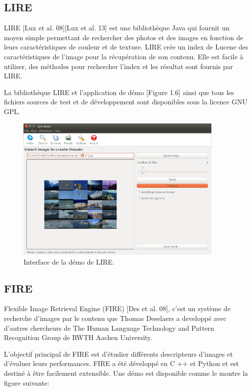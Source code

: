 \subsection*{LIRE}
	LIRE [Lux et al. 08][Lux et al. 13] est une bibliothèque Java qui fournit un moyen simple permettant de rechercher des photos et des images en fonction de leurs caractéristiques de couleur et de texture. LIRE crée un index de Lucene des caractéristiques de l'image pour la récupération de son contenu. Elle est facile à utiliser, des méthodes pour rechercher l'index et les résultat sont fournis par LIRE.
	
	La bibliothèque LIRE et l'application de démo [Figure 1.6] ainsi que tous les fichiers sources de test et de développement sont disponibles sous la licence GNU GPL.

\begin{figure}[H]
	\centering
		\includegraphics[width=4in]{Figures/lire-demo.png}
	\caption[An Electron]{Interface de la démo de LIRE.}
	\label{fig:Electron}
\end{figure}


\subsection*{FIRE}
	Flexible Image Retrieval Engine (FIRE) [Des et al. 08], c'est un système de recherche d'images par le contenu que Thomas Deselaers a developpé avec d'autres chercheurs de The Human Language Technology and Pattern Recognition Group de RWTH Aachen University.

L'objectif principal de FIRE est d'étudier différents descripteurs d'images et d'évaluer leurs performances. FIRE a été développé en C ++ et Python et est destiné à être facilement extensible. Une démo est disponible comme le montre la figure suivante:


